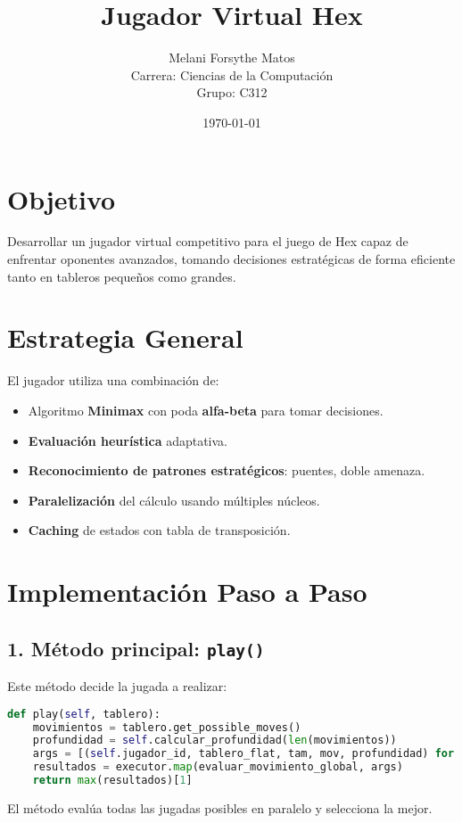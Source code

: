 \documentclass[12pt]{article}
\title{Jugador Virtual Hex}
\author{Melani Forsythe Matos \\ Carrera: Ciencias de la Computación \\ Grupo: C312}
\date{\today}
\begin{document}
\maketitle

\section{Objetivo}
Desarrollar un jugador virtual competitivo para el juego de Hex capaz de enfrentar oponentes avanzados, tomando decisiones estratégicas de forma eficiente tanto en tableros pequeños como grandes.

\section{Estrategia General}
El jugador utiliza una combinación de:
\begin{itemize}
  \item Algoritmo \textbf{Minimax} con poda \textbf{alfa-beta} para tomar decisiones.
  \item \textbf{Evaluación heurística} adaptativa.
  \item \textbf{Reconocimiento de patrones estratégicos}: puentes, doble amenaza.
  \item \textbf{Paralelización} del cálculo usando múltiples núcleos.
  \item \textbf{Caching} de estados con tabla de transposición.
\end{itemize}

\section{Implementación Paso a Paso}

\subsection{1. Método principal: \texttt{play()}}
Este método decide la jugada a realizar:

\begin{lstlisting}[language=Python]
def play(self, tablero):
    movimientos = tablero.get_possible_moves()
    profundidad = self.calcular_profundidad(len(movimientos))
    args = [(self.jugador_id, tablero_flat, tam, mov, profundidad) for mov in movimientos]
    resultados = executor.map(evaluar_movimiento_global, args)
    return max(resultados)[1]
\end{lstlisting}

El método evalúa todas las jugadas posibles en paralelo y selecciona la mejor.
\end{document}

